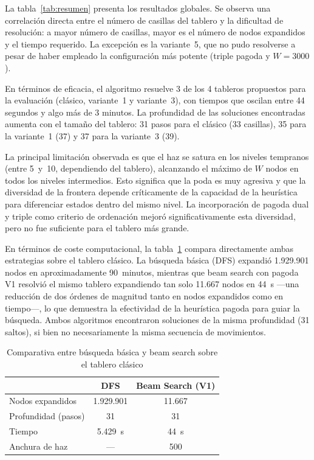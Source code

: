 \documentclass[conference,a4paper]{IEEEtran}
\begin{document}
La tabla~\ref{tab:resumen} presenta los resultados globales. Se observa una
correlación directa entre el número de casillas del tablero y la dificultad
de resolución: a mayor número de casillas, mayor es el número de nodos
expandidos y el tiempo requerido. La excepción es la variante~5, que no pudo
resolverse a pesar de haber empleado la configuración más potente (triple
pagoda y $W=3000$).

En términos de eficacia, el algoritmo resuelve 3 de los 4 tableros
propuestos para la evaluación (clásico, variante~1 y variante~3), con tiempos
que oscilan entre 44 segundos y algo más de 3 minutos. La profundidad de las
soluciones encontradas aumenta con el tamaño del tablero: 31 pasos para el
clásico (33 casillas), 35 para la variante~1 (37) y 37 para la variante~3
(39).

La principal limitación observada es que el haz se satura en los niveles
tempranos (entre 5~y~10, dependiendo del tablero), alcanzando el máximo de
$W$ nodos en todos los niveles intermedios. Esto significa que la poda es
muy agresiva y que la diversidad de la frontera depende críticamente de la
capacidad de la heurística para diferenciar estados dentro del mismo nivel.
La incorporación de pagoda dual y triple como criterio de ordenación mejoró
significativamente esta diversidad, pero no fue suficiente para el tablero
más grande.

En términos de coste computacional, la tabla~\ref{tab:comparativa} compara
directamente ambas estrategias sobre el tablero clásico. La búsqueda básica
(DFS) expandió 1.929.901 nodos en aproximadamente 90~minutos, mientras que
beam search con pagoda V1 resolvió el mismo tablero expandiendo tan solo
11.667 nodos en 44~s —una reducción de dos órdenes de magnitud tanto en
nodos expandidos como en tiempo—, lo que demuestra la efectividad de la
heurística pagoda para guiar la búsqueda. Ambos algoritmos encontraron
soluciones de la misma profundidad (31 saltos), si bien no necesariamente
la misma secuencia de movimientos.

\begin{table}
  \caption{Comparativa entre búsqueda básica y beam search sobre el tablero
           clásico}
  \label{tab:comparativa}
  \centering
  \begin{tabular}{lcc}
    \toprule
    & DFS & Beam Search (V1) \\
    \midrule
    Nodos expandidos & 1.929.901 & 11.667 \\
    Profundidad (pasos) & 31 & 31 \\
    Tiempo & 5.429~s & 44~s \\
    Anchura de haz & --- & 500 \\
    \bottomrule
  \end{tabular}
\end{table}
\end{document}
